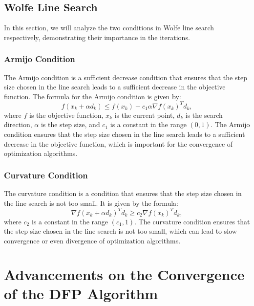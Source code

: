 \documentclass[12pt,a4paper,draft]{article}  %
\theoremstyle{definition}
\numberwithin{equation}{section}
\begin{document}
\subsection{Wolfe Line Search}
In this section, we will analyze the two conditions in Wolfe line search respectively, demonstrating their importance in the iterations.

\subsubsection{Armijo Condition}
The Armijo condition is a sufficient decrease condition that ensures that the step size chosen in the line search leads to a sufficient decrease in the objective function.
The formula for the Armijo condition is given by:
\[f(x_k + \alpha d_k) \leq f(x_k) + c_1 \alpha \nabla f(x_k)^T d_k,\]
where $f$ is the objective function, $x_k$ is the current point, $d_k$ is the search direction, $\alpha$ is the step size, and $c_1$ is a constant in the range $(0, 1)$.  The Armijo condition ensures that the step size chosen in the line search leads to a sufficient decrease in the objective function, which is important for the convergence of optimization algorithms.   

\subsubsection{Curvature Condition}
The curvature condition is a condition that ensures that the step size chosen in the line search is not too small. 
It is given by the formula:
\[\nabla f(x_k + \alpha d_k)^T d_k \geq c_2 \nabla f(x_k)^T d_k,\]
where $c_2$ is a constant in the range $(c_1, 1)$. The curvature condition ensures that the step size chosen in the line search is not too small, which can lead to slow convergence or even divergence of optimization algorithms.



\section{Advancements on the Convergence of the DFP Algorithm}
\end{document}
